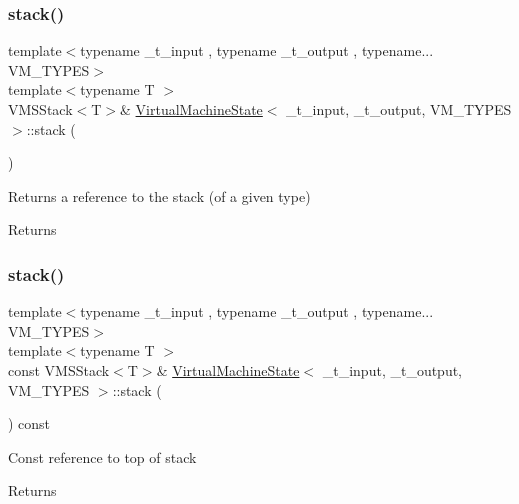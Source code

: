 \subsubsection{\texorpdfstring{stack()}{stack()}\hspace{0.1cm}{\footnotesize\ttfamily [1/2]}}
{\footnotesize\ttfamily template$<$typename \+\_\+t\+\_\+input , typename \+\_\+t\+\_\+output , typename... V\+M\+\_\+\+T\+Y\+P\+ES$>$ \\
template$<$typename T $>$ \\
V\+M\+S\+Stack$<$T$>$\& \hyperlink{class_virtual_machine_state}{Virtual\+Machine\+State}$<$ \+\_\+t\+\_\+input, \+\_\+t\+\_\+output, V\+M\+\_\+\+T\+Y\+P\+ES $>$\+::stack (\begin{DoxyParamCaption}{ }\end{DoxyParamCaption})\hspace{0.3cm}{\ttfamily [inline]}}

Returns a reference to the stack (of a given type) \begin{DoxyReturn}{Returns}

\end{DoxyReturn}
\mbox{\label{class_virtual_machine_state_adc77f615f164e83ee4a25f06b3a5b64d}} 
\subsubsection{\texorpdfstring{stack()}{stack()}\hspace{0.1cm}{\footnotesize\ttfamily [2/2]}}
{\footnotesize\ttfamily template$<$typename \+\_\+t\+\_\+input , typename \+\_\+t\+\_\+output , typename... V\+M\+\_\+\+T\+Y\+P\+ES$>$ \\
template$<$typename T $>$ \\
const V\+M\+S\+Stack$<$T$>$\& \hyperlink{class_virtual_machine_state}{Virtual\+Machine\+State}$<$ \+\_\+t\+\_\+input, \+\_\+t\+\_\+output, V\+M\+\_\+\+T\+Y\+P\+ES $>$\+::stack (\begin{DoxyParamCaption}{ }\end{DoxyParamCaption}) const\hspace{0.3cm}{\ttfamily [inline]}}

Const reference to top of stack \begin{DoxyReturn}{Returns}

\end{DoxyReturn}
\mbox{\label{class_virtual_machine_state_a08cc1e3bf25e9bf58f798102e364856a}} 
